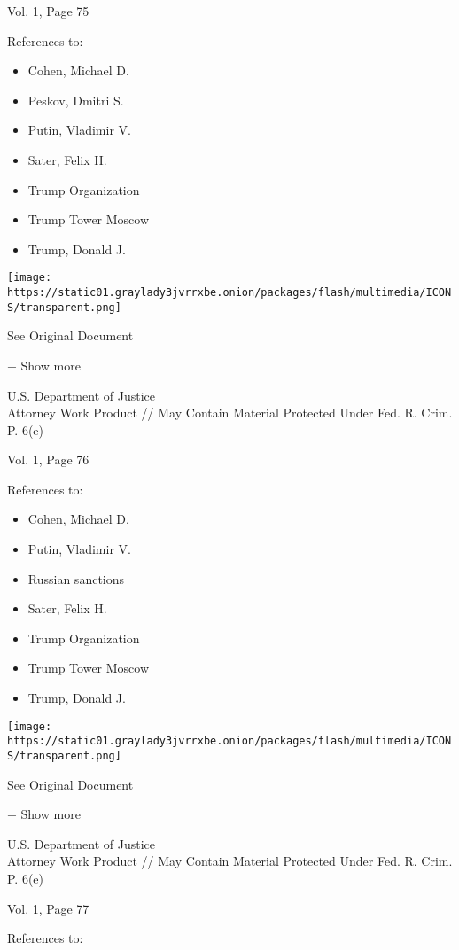 Vol. 1, Page 75

References to:

\begin{itemize}
\tightlist
\item
  Cohen, Michael D.
\item
  Peskov, Dmitri S.
\item
  Putin, Vladimir V.
\item
  Sater, Felix H.
\item
  Trump Organization
\item
  Trump Tower Moscow
\item
  Trump, Donald J.
\end{itemize}

\protect\hyperlink{}{}

\texttt{[image: https://static01.graylady3jvrrxbe.onion/packages/flash/multimedia/ICONS/transparent.png]}

See Original Document

+ Show more

U.S. Department of Justice\\
Attorney Work Product // May Contain Material Protected Under Fed. R.
Crim. P. 6(e)

Vol. 1, Page 76

References to:

\begin{itemize}
\tightlist
\item
  Cohen, Michael D.
\item
  Putin, Vladimir V.
\item
  Russian sanctions
\item
  Sater, Felix H.
\item
  Trump Organization
\item
  Trump Tower Moscow
\item
  Trump, Donald J.
\end{itemize}

\protect\hyperlink{}{}

\texttt{[image: https://static01.graylady3jvrrxbe.onion/packages/flash/multimedia/ICONS/transparent.png]}

See Original Document

+ Show more

U.S. Department of Justice\\
Attorney Work Product // May Contain Material Protected Under Fed. R.
Crim. P. 6(e)

Vol. 1, Page 77

References to:


